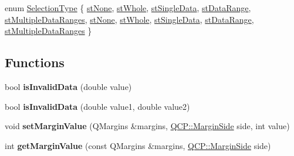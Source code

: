 \begin{DoxyCompactItemize}
enum \hyperlink{namespace_q_c_p_ac6cb9db26a564b27feda362a438db038}{Selection\+Type} \{ \newline
\hyperlink{namespace_q_c_p_ac6cb9db26a564b27feda362a438db038a2cb7996ccc6c39b9e6d20f2e46bf3f57}{st\+None}, 
\hyperlink{namespace_q_c_p_ac6cb9db26a564b27feda362a438db038a70734549f1745196a5b3ae8b8d158d52}{st\+Whole}, 
\hyperlink{namespace_q_c_p_ac6cb9db26a564b27feda362a438db038a83873962d48d31fa01ac36f859c00f67}{st\+Single\+Data}, 
\hyperlink{namespace_q_c_p_ac6cb9db26a564b27feda362a438db038a1db42782cc5852ace37e61244df1b7ad}{st\+Data\+Range}, 
\newline
\hyperlink{namespace_q_c_p_ac6cb9db26a564b27feda362a438db038ab68af6f04366b667f30f3bf1276eaf4f}{st\+Multiple\+Data\+Ranges}, 
\hyperlink{namespace_q_c_p_ac6cb9db26a564b27feda362a438db038a2cb7996ccc6c39b9e6d20f2e46bf3f57}{st\+None}, 
\hyperlink{namespace_q_c_p_ac6cb9db26a564b27feda362a438db038a70734549f1745196a5b3ae8b8d158d52}{st\+Whole}, 
\hyperlink{namespace_q_c_p_ac6cb9db26a564b27feda362a438db038a83873962d48d31fa01ac36f859c00f67}{st\+Single\+Data}, 
\newline
\hyperlink{namespace_q_c_p_ac6cb9db26a564b27feda362a438db038a1db42782cc5852ace37e61244df1b7ad}{st\+Data\+Range}, 
\hyperlink{namespace_q_c_p_ac6cb9db26a564b27feda362a438db038ab68af6f04366b667f30f3bf1276eaf4f}{st\+Multiple\+Data\+Ranges}
 \}
\end{DoxyCompactItemize}
\subsection*{Functions}
\begin{DoxyCompactItemize}
\item 
\mbox{\label{namespace_q_c_p_a07ab701c05329089f933b9cae2638a63}} 
bool {\bfseries is\+Invalid\+Data} (double value)
\item 
\mbox{\label{namespace_q_c_p_a728903e5c3dd17847bee280f4005496f}} 
bool {\bfseries is\+Invalid\+Data} (double value1, double value2)
\item 
\mbox{\label{namespace_q_c_p_afbf6e3084c108f2bb4372107945ee82f}} 
void {\bfseries set\+Margin\+Value} (Q\+Margins \&margins, \hyperlink{namespace_q_c_p_a7e487e3e2ccb62ab7771065bab7cae54}{Q\+C\+P\+::\+Margin\+Side} side, int value)
\item 
\mbox{\label{namespace_q_c_p_a23a2679d3495c444acc26acc61e35b5b}} 
int {\bfseries get\+Margin\+Value} (const Q\+Margins \&margins, \hyperlink{namespace_q_c_p_a7e487e3e2ccb62ab7771065bab7cae54}{Q\+C\+P\+::\+Margin\+Side} side)
\end{DoxyCompactItemize}
